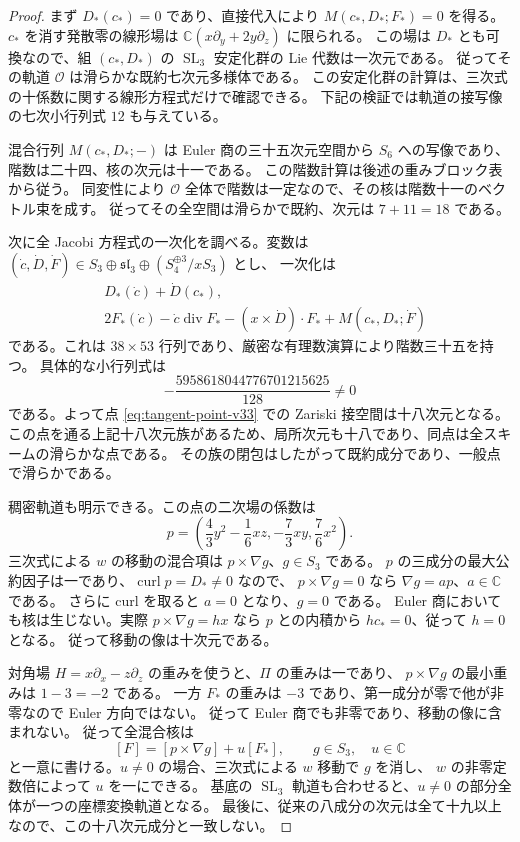 \begin{proof}
まず $D_*(c_*)=0$ であり、直接代入により $M(c_*,D_*;F_*)=0$ を得る。
$c_*$ を消す発散零の線形場は
$\mathbb C(x\partial_y+2y\partial_z)$ に限られる。
この場は $D_*$ とも可換なので、組 $(c_*,D_*)$ の
$\operatorname{SL}_3$ 安定化群の Lie 代数は一次元である。
従ってその軌道 $\mathcal O$ は滑らかな既約七次元多様体である。
この安定化群の計算は、三次式の十係数に関する線形方程式だけで確認できる。
下記の検証では軌道の接写像の七次小行列式 $12$ も与えている。

混合行列 $M(c_*,D_*;-)$ は Euler 商の三十五次元空間から $S_6$ への写像であり、
階数は二十四、核の次元は十一である。
この階数計算は後述の重みブロック表から従う。
同変性により $\mathcal O$ 全体で階数は一定なので、その核は階数十一のベクトル束を成す。
従ってその全空間は滑らかで既約、次元は $7+11=18$ である。

次に全 Jacobi 方程式の一次化を調べる。変数は
$(\dot c,\dot D,\dot F)\in S_3\oplus\mathfrak{sl}_3\oplus(S_4^{\oplus3}/xS_3)$ とし、
一次化は
\begin{align*}
 &D_*(\dot c)+\dot D(c_*),\\
 &2F_*(\dot c)-\dot c\operatorname{div}F_*
  -(x\times\dot D)\cdot F_*+M(c_*,D_*;\dot F)
\end{align*}
である。これは $38\times53$ 行列であり、厳密な有理数演算により階数三十五を持つ。
具体的な小行列式は
\begin{equation}
 -\frac{5958618044776701215625}{128}\ne0
 \label{eq:tangent-jac-minor-v33}
\end{equation}
である。よって点 \eqref{eq:tangent-point-v33} での Zariski 接空間は十八次元となる。
この点を通る上記十八次元族があるため、局所次元も十八であり、同点は全スキームの滑らかな点である。
その族の閉包はしたがって既約成分であり、一般点で滑らかである。

稠密軌道も明示できる。この点の二次場の係数は
\[
 p=\left(\frac43y^2-\frac16xz,-\frac73xy,\frac76x^2\right).
\]
三次式による $w$ の移動の混合項は $p\times\nabla g$、$g\in S_3$ である。
$p$ の三成分の最大公約因子は一であり、$\operatorname{curl}p=D_*\ne0$ なので、
$p\times\nabla g=0$ なら $\nabla g=ap$、$a\in\mathbb C$ である。
さらに curl を取ると $a=0$ となり、$g=0$ である。
Euler 商においても核は生じない。実際
$p\times\nabla g=h x$ なら $p$ との内積から $h c_*=0$、従って $h=0$ となる。
従って移動の像は十次元である。

対角場 $H=x\partial_x-z\partial_z$ の重みを使うと、$\Pi$ の重みは一であり、
$p\times\nabla g$ の最小重みは $1-3=-2$ である。
一方 $F_*$ の重みは $-3$ であり、第一成分が零で他が非零なので Euler 方向ではない。
従って Euler 商でも非零であり、移動の像に含まれない。
従って全混合核は
\[
 [F]=[p\times\nabla g]+u[F_*],\qquad g\in S_3,\quad u\in\mathbb C
\]
と一意に書ける。$u\ne0$ の場合、三次式による $w$ 移動で $g$ を消し、
$w$ の非零定数倍によって $u$ を一にできる。
基底の $\operatorname{SL}_3$ 軌道も合わせると、$u\ne0$ の部分全体が一つの座標変換軌道となる。
最後に、従来の八成分の次元は全て十九以上なので、この十八次元成分と一致しない。
\end{proof}

